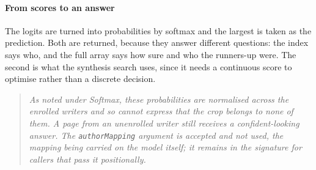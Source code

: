 \paragraph{From scores to an answer}
The logits are turned into probabilities by softmax and the largest is taken as the prediction. Both are returned, because they answer different questions: the index says who, and the full array says how sure and who the runners-up were. The second is what the synthesis search uses, since it needs a continuous score to optimise rather than a discrete decision.


\begin{quote}\small\itshape As noted under Softmax, these probabilities are normalised across the enrolled writers and so cannot express that the crop belongs to none of them. A page from an unenrolled writer still receives a confident-looking answer. The \texttt{authorMapping} argument is accepted and not used, the mapping being carried on the model itself; it remains in the signature for callers that pass it positionally.\end{quote}
